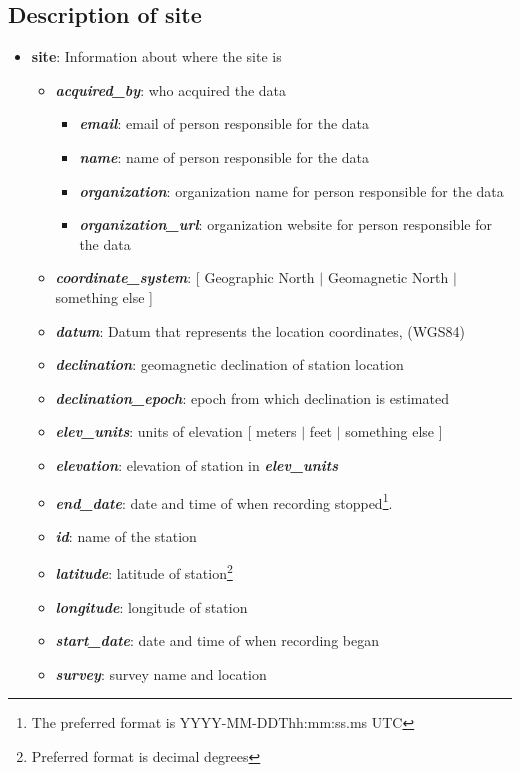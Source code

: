 \documentclass{article}
\newcommand{\attr}[1]{\textbf{\textit{#1}}}
\begin{document}
\subsection{Description of \textbf{site}}

\begin{itemize}
	\item \textbf{site}: Information about where the site is
	\begin{itemize}
		\item \attr{acquired\_by}: who acquired the data
		\begin{itemize}
			\item \attr{email}: email of person responsible for the data
			\item \attr{name}: name of person responsible for the data
			\item \attr{organization}: organization name for person responsible for the data
			\item \attr{organization\_url}: organization website for person responsible for the data
		\end{itemize}
		\item \attr{coordinate\_system}: [ Geographic North $|$ Geomagnetic North $|$ something else ]
		\item \attr{datum}: Datum that represents the location coordinates, (WGS84)
		\item \attr{declination}: geomagnetic declination of station location
		\item \attr{declination\_epoch}: epoch from which declination is estimated
		\item \attr{elev\_units}: units of elevation [ meters $|$ feet $|$ something else ]
		\item \attr{elevation}: elevation of station in \attr{elev\_units}
		\item \attr{end\_date}: date and time of when recording stopped\footnote[1]{The preferred format is YYYY-MM-DDThh:mm:ss.ms UTC}.
		\item \attr{id}: name of the station
		\item \attr{latitude}: latitude of station\footnote[2]{Preferred format is decimal degrees}
		\item \attr{longitude}: longitude of station\footnotemark[2]
		\item \attr{start\_date}: date and time of when recording began\footnotemark[1]
		\item \attr{survey}: survey name and location  
	\end{itemize}
\end{itemize}
\end{document}
